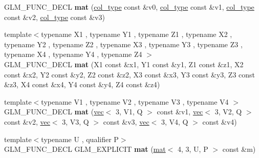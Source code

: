 \begin{DoxyCompactItemize}
\item 
\mbox{\label{structglm_1_1mat_3_014_00_013_00_01T_00_01Q_01_4_addc2be40841b30e489c97189f1f3c7fd}} 
G\+L\+M\+\_\+\+F\+U\+N\+C\+\_\+\+D\+E\+CL {\bfseries mat} (\hyperlink{structglm_1_1vec_3_013_00_01T_00_01Q_01_4}{col\+\_\+type} const \&v0, \hyperlink{structglm_1_1vec_3_013_00_01T_00_01Q_01_4}{col\+\_\+type} const \&v1, \hyperlink{structglm_1_1vec_3_013_00_01T_00_01Q_01_4}{col\+\_\+type} const \&v2, \hyperlink{structglm_1_1vec_3_013_00_01T_00_01Q_01_4}{col\+\_\+type} const \&v3)
\item 
\mbox{\label{structglm_1_1mat_3_014_00_013_00_01T_00_01Q_01_4_aaaa1a809455a9c3ff17551e02cb60a6c}} 
{\footnotesize template$<$typename X1 , typename Y1 , typename Z1 , typename X2 , typename Y2 , typename Z2 , typename X3 , typename Y3 , typename Z3 , typename X4 , typename Y4 , typename Z4 $>$ }\\G\+L\+M\+\_\+\+F\+U\+N\+C\+\_\+\+D\+E\+CL {\bfseries mat} (X1 const \&x1, Y1 const \&y1, Z1 const \&z1, X2 const \&x2, Y2 const \&y2, Z2 const \&z2, X3 const \&x3, Y3 const \&y3, Z3 const \&z3, X4 const \&x4, Y4 const \&y4, Z4 const \&z4)
\item 
\mbox{\label{structglm_1_1mat_3_014_00_013_00_01T_00_01Q_01_4_ac77ac6918ef79ff9183b033ad6d3cee2}} 
{\footnotesize template$<$typename V1 , typename V2 , typename V3 , typename V4 $>$ }\\G\+L\+M\+\_\+\+F\+U\+N\+C\+\_\+\+D\+E\+CL {\bfseries mat} (\hyperlink{structglm_1_1vec}{vec}$<$ 3, V1, Q $>$ const \&v1, \hyperlink{structglm_1_1vec}{vec}$<$ 3, V2, Q $>$ const \&v2, \hyperlink{structglm_1_1vec}{vec}$<$ 3, V3, Q $>$ const \&v3, \hyperlink{structglm_1_1vec}{vec}$<$ 3, V4, Q $>$ const \&v4)
\item 
\mbox{\label{structglm_1_1mat_3_014_00_013_00_01T_00_01Q_01_4_a8aa2454590c6c3bdebf751e3de5a8de1}} 
{\footnotesize template$<$typename U , qualifier P$>$ }\\G\+L\+M\+\_\+\+F\+U\+N\+C\+\_\+\+D\+E\+CL G\+L\+M\+\_\+\+E\+X\+P\+L\+I\+C\+IT {\bfseries mat} (\hyperlink{structglm_1_1mat}{mat}$<$ 4, 3, U, P $>$ const \&m)
\item 
\mbox{\label{structglm_1_1mat_3_014_00_013_00_01T_00_01Q_01_4_a30b2e36af282e1194f9a9180b074f719}} 

\end{DoxyCompactItemize}
